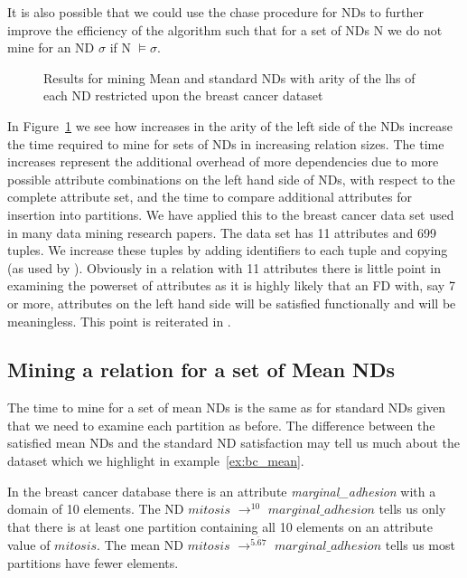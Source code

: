 \medskip

It is also possible that we could use the chase procedure for NDs to
further improve the efficiency of the algorithm such that for a set of NDs
N we do not mine for an ND $\sigma$ if N $\models \sigma$.

\begin{figure}
\centerline{}
\caption{\label{graph:nd_mine1}{Results for mining Mean and
standard NDs with arity of the lhs of each ND restricted upon the
breast cancer dataset}}
\end{figure}

In Figure~\ref{graph:nd_mine1} we see how increases in the arity of
the left side of the NDs increase the time required to mine for sets
of NDs in increasing relation sizes. The time increases represent the
additional overhead of more dependencies due to more possible
attribute combinations on the left hand side of NDs, with respect to
the complete attribute set, and the time to compare additional
attributes for insertion into partitions. We have applied this to the
breast cancer data set \cite{bkm98} used in many data mining research
papers. The data set has 11 attributes and 699 tuples. We increase
these tuples by adding identifiers to each tuple and copying (as used
by \cite{hkp98}). Obviously in a relation with 11 attributes 
there is little point in examining the powerset of attributes as it is
highly likely that an FD with, say 7 or more, attributes on the left hand
side will be satisfied functionally and will be meaningless. This
point is reiterated in \cite{sf93}. 

\subsection{Mining a relation for a set of Mean NDs}

The time to mine for a set of mean NDs is the same as for standard
NDs given that we need to examine each partition as before.
The difference between the satisfied mean NDs and the standard ND
satisfaction may tell us much about the dataset which we highlight in
example~\ref{ex:bc_mean}.

\begin{example}\label{ex:bc_mean}
\begin{rm}
In the breast cancer database there is an attribute {\em
marginal\_adhesion} with a domain of 10 elements. The ND $mitosis$
$\to^{10}$ $marginal\_adhesion$ tells
us only that there is at least one partition containing all 10
elements on an attribute value of
$mitosis$. The mean ND $mitosis$ $\to^{\bar{5.67}}$
$marginal\_adhesion$ tells us most partitions have fewer elements.
\end{rm}
\end{example}


